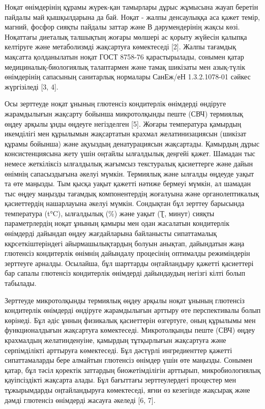 Ноқат өнімдерінің құрамы жүрек-қан тамырлары дұрыс жұмысына жауап
беретін пайдалы май қышқылдарына да бай. Ноқат - жалпы денсаулыққа аса
қажет темір, магний, фосфор сияқты пайдалы заттар және В дәрумендерінің
жақсы көзі. Ноқаттағы диеталық талшықтың жоғары мөлшері ас қорыту
жүйесін қалыпқа келтіруге және метаболизмді жақсартуға көмектеседі
{[}2{]}. Жалпы тағамдық мақсатта қолданылатын ноқат ГОСТ 8758-76
қарастырылады, сонымен қатар медициналық-биологиялық талаптармен және
тамақ шикізаты мен азық-түлік өнімдерінің сапасының санитарлық нормалары
СанЕж/еН 1.3.2.1078-01 сәйкес жүргізіледі {[}3, 4{]}.

Осы зерттеуде ноқат ұнының глютенсіз кондитерлік өнімдерді өндіруге
жарамдылығын жақсарту бойынша микротолқынды пеште (СВЧ) термиялық өңдеу
арқылы ұнды өңдеуге негізделген {[}5{]}. Жоғары температура қамырдың
икемділігі мен құрылымын жақсартатын крахмал желатинизациясын (шикізат
құрамы бойынша) және ақуыздың денатурациясын жақсартады. Қамырдың дұрыс
консистенциясына жету үшін оңтайлы ылғалдылық деңгейі қажет. Шамадан тыс
немесе жеткіліксіз ылғалдылық жағымсыз текстуралық қасиеттерге және
дайын өнімнің сапасыздығына әкелуі мүмкін. Термиялық және ылғалды
өңдеуде уақыт та өте маңызды. Тым қысқа уақыт қажетті нәтиже бермеуі
мүмкін, ал шамадан тыс өңдеу маңызды тағамдық компонентердің жоғалуына
және органолептикалық қасиеттердің нашарлауына әкелуі мүмкін. Сондықтан
бұл зерттеу барысында температура (t°C), ылғалдылық (\%) және уақыт (Ʈ,
минут) сияқты параметрлердің ноқат ұнының қамыры мен одан жасалатын
кондитерлік өнімдерді дайындап өңдеу жағдайларына байланысты
сипаттамалық кқрсеткіштеріндегі айырмашылықтардың болуын анықтап,
дайындатын жаңа глютенсіз кондитерлік өнімнің дайындалу процесінің
оптималды режиміндерін зерттеуге арналды. Осылайша, бұл шарттарды
оңтайландыру қажетті қасиеттері бар сапалы глютенсіз кондитерлік
өнімдерді дайындаудың негізгі кілті болып табылады.

Зерттеуде микротолқынды термиялық өңдеу арқылы ноқат ұнының глютенсіз
кондитерлік өнімдерді өндіруге жарамдылығын арттыру өте перспективалы
болып көрінеді. Бұл әдіс ұнның физикалық қасиеттерін өзгертуге, оның
құрылымы мен функционалдығын жақсартуға көмектеседі. Микротолқынды пеште
(СВЧ) өңдеу крахмалдың желатинденуіне, қамырдың тұтқырлығын жақсартуға
және серпімділікті арттыруға көмектеседі. Бұл дәстүрлі ингредиенттер
қажетті сипаттамаларды бере алмайтын глютенсіз өнімдер үшін өте маңызды.
Сонымен қатар, бұл тәсіл қоректік заттардың биожетімділігін арттырып,
микробиологиялық қауіпсіздікті жақсарта алады. Бұл бағыттағы
зерттеулердегі процестер мен тұжырымдарды оңтайландыруға көмектеседі,
яғни өз кезегінде жақсырақ және дәмді глютенсіз өнімдерді жасауға
әкеледі {[}6, 7{]}.

